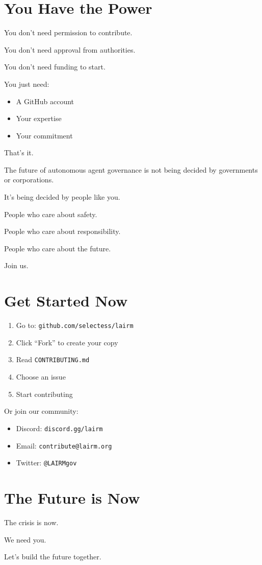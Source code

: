 \documentclass[12pt,a4paper,twoside,openright]{book}
\begin{document}
\section{You Have the Power}

You don't need permission to contribute.

You don't need approval from authorities.

You don't need funding to start.

You just need:
\begin{itemize}
    \item A GitHub account
    \item Your expertise
    \item Your commitment
\end{itemize}

That's it.

The future of autonomous agent governance is not being decided by governments or corporations.

It's being decided by people like you.

People who care about safety.

People who care about responsibility.

People who care about the future.

Join us.

\section{Get Started Now}

\begin{enumerate}
    \item Go to: \texttt{github.com/selectess/lairm}
    \item Click ``Fork'' to create your copy
    \item Read \texttt{CONTRIBUTING.md}
    \item Choose an issue
    \item Start contributing
\end{enumerate}

Or join our community:
\begin{itemize}
    \item Discord: \texttt{discord.gg/lairm}
    \item Email: \texttt{contribute@lairm.org}
    \item Twitter: \texttt{@LAIRMgov}
\end{itemize}

\section{The Future is Now}

The crisis is now.

We need you.

Let's build the future together.

\cleardoublepage

\printbibliography[heading=bibintoc,title={References and Bibliography}]
\end{document}
